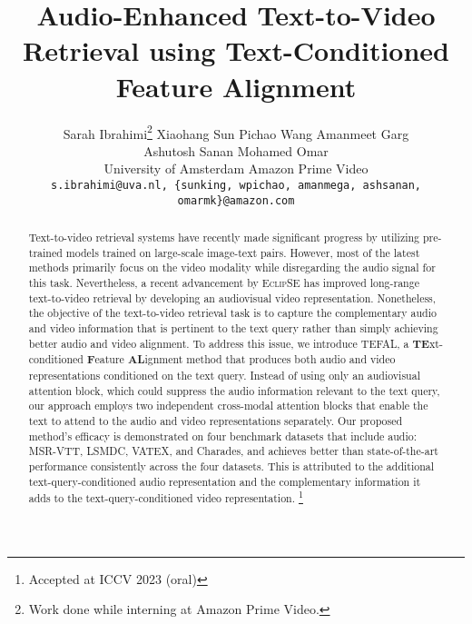 \documentclass[10pt,twocolumn,letterpaper]{article}
\newcommand{\Hquad}{\hspace{1em}}
\newcommand\blfootnote[1]{\begingroup
  \renewcommand\thefootnote{}\footnote{#1}\addtocounter{footnote}{-1}\endgroup
}
\begin{document}
\title{Audio-Enhanced Text-to-Video Retrieval using Text-Conditioned Feature Alignment}


\author{Sarah Ibrahimi\thanks{Work done while interning at Amazon Prime Video.} \Hquad Xiaohang Sun \Hquad Pichao Wang \Hquad Amanmeet Garg \\ \Hquad Ashutosh Sanan \Hquad Mohamed Omar\\
 University of Amsterdam \quad  Amazon Prime Video\\
{\tt\small s.ibrahimi@uva.nl, \{sunking, wpichao, amanmega, ashsanan, omarmk\}@amazon.com}
}

\maketitle

\ificcvfinal\thispagestyle{empty}\fi

\begin{abstract}
Text-to-video retrieval systems have recently made significant progress by utilizing pre-trained models trained on large-scale image-text pairs. However, most of the latest methods primarily focus on the video modality while disregarding the audio signal for this task. Nevertheless, a recent advancement by E\textsc{clip}SE has improved long-range text-to-video retrieval by developing an audiovisual video representation. Nonetheless, the objective of the text-to-video retrieval task is to capture the complementary audio and video information that is pertinent to the text query rather than simply achieving better audio and video alignment. To address this issue, we introduce TEFAL, a \textbf{TE}xt-conditioned \textbf{F}eature \textbf{AL}ignment method that produces both audio and video representations conditioned on the text query. Instead of using only an audiovisual attention block, which could suppress the audio information relevant to the text query, our approach employs two independent cross-modal attention blocks that enable the text to attend to the audio and video representations separately. Our proposed method's efficacy is demonstrated on four benchmark datasets that include audio: MSR-VTT, LSMDC, VATEX, and Charades, and achieves better than state-of-the-art performance consistently across the four datasets. This is attributed to the additional text-query-conditioned audio representation and the complementary information it adds to the text-query-conditioned video representation. \blfootnote{Accepted at ICCV 2023 (oral)}
\end{abstract}
\end{document}
